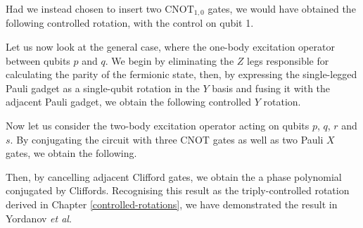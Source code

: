 
Had we instead chosen to insert two $\text{CNOT}_{1, 0}$ gates, we would have obtained the following controlled rotation, with the control on qubit 1.


Let us now look at the general case, where the one-body excitation operator between qubits $p$ and $q$. We begin by eliminating the $Z$ legs responsible for calculating the parity of the fermionic state, then, by expressing the single-legged Pauli gadget as a single-qubit rotation in the $Y$ basis and fusing it with the adjacent Pauli gadget, we obtain the following controlled $Y$ rotation.


\newpage
Now let us consider the two-body excitation operator acting on qubits $p$, $q$, $r$ and $s$. By conjugating the circuit with three CNOT gates as well as two Pauli $X$ gates, we obtain the following.


Then, by cancelling adjacent Clifford gates, we obtain the a phase polynomial conjugated by Cliffords. Recognising this result as the triply-controlled rotation derived in Chapter \ref{controlled-rotations}, we have demonstrated the result in Yordanov \textit{et al}.

